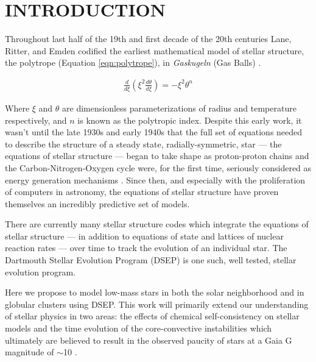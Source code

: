 \section{INTRODUCTION}
Throughout last half of the 19th and first decade of the 20th centuries Lane,
Ritter, and Emden codified the earliest mathematical model of stellar
structure, the polytrope (Equation \ref{eqn:polytrope}), in \textit{Gaskugeln}
(Gas Balls) \citep{Emden1907}.

\begin{align}\label{eqn:polytrope}
	\frac{d}{d\xi}\left(\xi^{2}\frac{d\theta}{d\xi}\right) = -\xi^{2}\theta^{n}
\end{align}

Where $\xi$ and $\theta$ are dimensionless parameterizations of radius and
temperature respectively, and $n$ is known as the polytropic index. Despite this
early work, it wasn't until the late 1930s and early 1940s that the full set of
equations needed to describe the structure of a steady state,
radially-symmetric, star --- the equations of stellar structure --- began to
take shape as proton-proton chains and the Carbon-Nitrogen-Oxygen cycle were,
for the first time, seriously considered as energy generation mechanisms
\citep{Cowling1966}. Since then, and especially with the proliferation of
computers in astronomy, the equations of stellar structure have proven
themselves an incredibly predictive set of models.  

There are currently many stellar structure codes \citep[e.g.][]{Dotter2008,
Kovetz2009, Paxton2011} which integrate the equations of stellar structure ---
in addition to equations of state and lattices of nuclear reaction rates ---
over time to track the evolution of an individual star. The Dartmouth Stellar
Evolution Program (DSEP) \citep{Chaboyer2001, Bjork2006, Dotter2008} is one
such, well tested, stellar evolution program.

Here we propose to model low-mass stars in both the solar neighborhood
and in globular clusters using DSEP. This work will primarily extend our
understanding of stellar physics in two areas: the effects of chemical
self-consistency on stellar models \citep[e.g.][]{Dotter2015} and the time
evolution of the core-convective instabilities which ultimately are believed to
result in the observed paucity of stars at a Gaia G magnitude of $\sim$10
\citep{Jao2018, Feiden2021}. 


